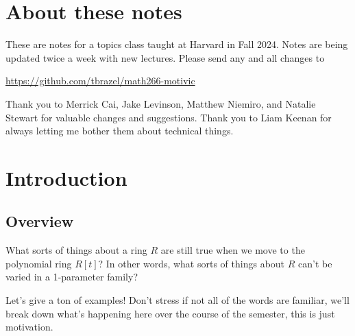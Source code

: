 \documentclass[11pt]{amsart}
\begin{document}
\begin{abstract} Notes from MATH266: Motivic homotopy theory, taught at Harvard in Fall 2024. Last compiled: \today
\end{abstract}

\maketitle

\setcounter{tocdepth}{1}
\tableofcontents{}


\setlength{\parskip}{0.2em}

\setcounter{section}{-1}

\section*{About these notes}

These are notes for a topics class taught at Harvard in Fall 2024. Notes are being updated twice a week with new lectures. Please send any and all changes to
\begin{center}
    \href{https://github.com/tbrazel/math266-motivic}{https://github.com/tbrazel/math266-motivic}
\end{center}
Thank you to Merrick Cai, Jake Levinson, Matthew Niemiro, and Natalie Stewart for valuable changes and suggestions. Thank you to Liam Keenan for always letting me bother them about technical things.

\section{Introduction}

\subsection{Overview} What sorts of things about a ring $R$ are still true when we move to the polynomial ring $R[t]$? In other words, what sorts of things about $R$ can't be varied in a 1-parameter family?

Let's give a ton of examples! Don't stress if not all of the words are familiar, we'll break down what's happening here over the course of the semester, this is just motivation.
\end{document}
